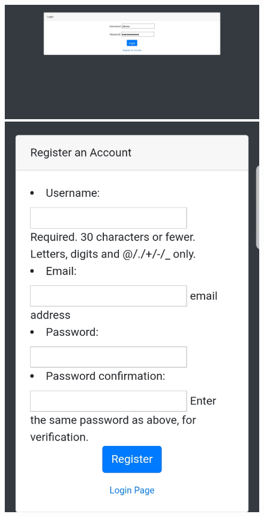 \documentclass[a4paper, 10pt]{article}
\begin{document}
\begin{figure}[ht!]
\begin{center}
\begin{minipage}[b]{0.30\textwidth}
\includegraphics[scale=0.17]{images/login.jpg}
\end{minipage}\hfill
\begin{minipage}[b]{0.30\textwidth}
\includegraphics[scale=0.17]{images/register.jpg}

\end{minipage}
\end{center}
\end{figure}
\end{document}
